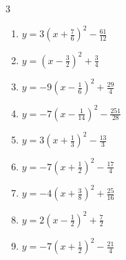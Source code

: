\begin{multicols}{3}
\begin{enumerate}

  \item $\displaystyle y=3\left( x+\frac{7}{6}\right)^{2}-\frac{61}{12}$


  \item $\displaystyle y=\left( x-\frac{3}{2}\right)^{2}+\frac{3}{4}$


  \item $\displaystyle y=-9\left( x-\frac{1}{6}\right)^{2}+\frac{29}{4}$


  \item $\displaystyle y=-7\left( x-\frac{1}{14}\right)^{2}-\frac{251}{28}$


  \item $\displaystyle y=3\left( x+\frac{1}{3}\right)^{2}-\frac{13}{3}$


  \item $\displaystyle y=-7\left( x+\frac{1}{2}\right)^{2}-\frac{17}{4}$


  \item $\displaystyle y=-4\left( x+\frac{3}{8}\right)^{2}+\frac{25}{16}$


\columnbreak %

  \item $\displaystyle y=2\left( x-\frac{1}{2}\right)^{2}+\frac{7}{2}$


  \item $\displaystyle y=-7\left( x+\frac{1}{2}\right)^{2}-\frac{21}{4}$



\end{enumerate}
\end{multicols}
